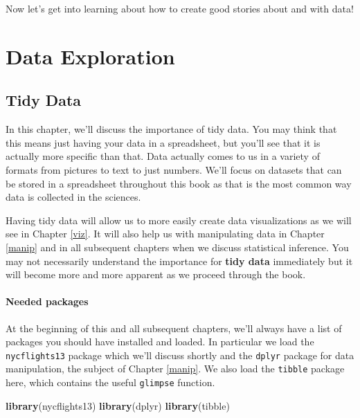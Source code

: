 \documentclass[]{tufte-book}
\newenvironment{Shaded}{\begin{snugshade}}{\end{snugshade}}
\newcommand{\KeywordTok}[1]{\textcolor[rgb]{0.13,0.29,0.53}{\textbf{{#1}}}}
\newcommand{\NormalTok}[1]{{#1}}
\begin{document}
Now let's get into learning about how to create good stories about and
with data!

\part{Data Exploration}\label{part-data-exploration}

\chapter{Tidy Data}\label{tidy}

In this chapter, we'll discuss the importance of tidy data. You may
think that this means just having your data in a spreadsheet, but you'll
see that it is actually more specific than that. Data actually comes to
us in a variety of formats from pictures to text to just numbers. We'll
focus on datasets that can be stored in a spreadsheet throughout this
book as that is the most common way data is collected in the sciences.

Having tidy data will allow us to more easily create data visualizations
as we will see in Chapter \ref{viz}. It will also help us with
manipulating data in Chapter \ref{manip} and in all subsequent chapters
when we discuss statistical inference. You may not necessarily
understand the importance for \textbf{tidy data} immediately but it will
become more and more apparent as we proceed through the book.

\subsection*{Needed packages}\label{needed-packages}

At the beginning of this and all subsequent chapters, we'll always have
a list of packages you should have installed and loaded. In particular
we load the \texttt{nycflights13} package which we'll discuss shortly
and the \texttt{dplyr} package for data manipulation, the subject of
Chapter \ref{manip}. We also load the \texttt{tibble} package here,
which contains the useful \texttt{glimpse} function.

\begin{Shaded}
\begin{Highlighting}[]
\KeywordTok{library}\NormalTok{(nycflights13)}
\KeywordTok{library}\NormalTok{(dplyr)}
\KeywordTok{library}\NormalTok{(tibble)}
\end{Highlighting}
\end{Shaded}
\end{document}
